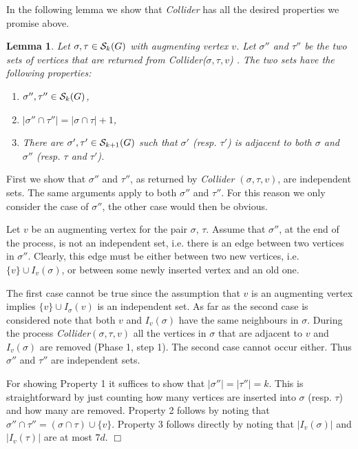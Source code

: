 \documentclass[a4paper,10pt]{article}
\makeatletter
\newtheorem{lemma}{Lemma}\renewcommand{\thelemma}{\arabic{lemma}}
\newenvironment{proof}{\noindent{\bf Proof\@:}}{\hfill $\Box$\\}
\makeatother
\begin{document}
In the following lemma we show that {\em Collider} has all the
desired properties we promise above.


\begin{lemma}\label{lemma:TrnsfrmProperties}
Let $\sigma, \tau \in {\cal S}_k(G)$ with augmenting vertex $v$.
Let $\sigma''$ and $\tau''$ be the two sets of vertices that are 
returned from {\em Collider($\sigma, \tau, v$)} .
The two sets have the following properties:
\begin{enumerate}
	\item $\sigma'', \tau'' \in {\cal S}_k(G)$,
	\item $|\sigma''\cap \tau''|=|\sigma \cap \tau|+1$,
	\item There are  $\sigma', \tau'\in {\cal S}_{k+1}(G)$
	such that $\sigma'$ (resp. $\tau'$) is adjacent to both 
	$\sigma$ and $\sigma''$ (resp. $\tau$ and $\tau'$).
\end{enumerate}
\end{lemma}
\begin{proof}
First we show that $\sigma''$ and $\tau''$, as returned by {\em Collider
$(\sigma, \tau, v)$}, are independent sets. The same arguments
apply to both $\sigma''$ and $\tau''$. For this reason we only consider 
the case of $\sigma''$, the other case would then be obvious.


Let $v$ be an augmenting vertex for the pair $\sigma$, $\tau$.
Assume that $\sigma''$, at the end of the process, is not 
an independent set, i.e. there is an edge between
two vertices in $\sigma''$. Clearly, this edge must be either 
between two new vertices, i.e. $\{v\}\cup I_v(\sigma)$, or
between some  newly inserted vertex  and an old one.


The first case cannot be true since the assumption that $v$
is an augmenting vertex implies $\{v\}\cup I_{\sigma}(v)$
is an independent set. As far as the second case is considered note that both $v$
and $I_v(\sigma)$ have the same neighbours in $\sigma$. During the
process {\em Collider}$(\sigma, \tau, v)$ all the vertices in 
$\sigma$ that are adjacent to $v$ and $I_v(\sigma)$ are removed
(Phase 1, step 1).  The second case cannot occur either. 
Thus $\sigma''$ and $\tau''$ are independent sets.


For showing Property 1 it suffices to show that $|\sigma''|=|\tau''|=k$.
This is straightforward by just counting how many vertices are inserted
into $\sigma$ (resp. $\tau$) and how many are removed. Property 2
follows by noting that $\sigma''\cap \tau''=(\sigma\cap \tau)\cup\{v\}$.
Property 3 follows directly by noting that $|I_v(\sigma)|$ and
$|I_v(\tau)|$ are at most $7d$.
\end{proof}
\end{document}
